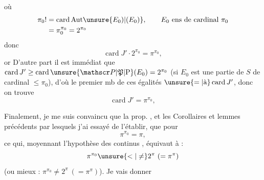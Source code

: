 où
\[
\begin{aligned}
\pi_0!&=\operatorname{card}\mathrm{Aut}\unsure{E_0)|(E_0)},\qquad E_0\text{ ens de cardinal }\pi_0\\
&=\pi_0^{\pi_0}=2^{\pi_0}
\end{aligned}
\]
donc
\[
\operatorname{card}J'\cdot2^{\pi_0}=\pi^{\pi_0},
\]
or
D'autre part il est immédiat que $\operatorname{card}J'\geq\operatorname{card}\unsure{\mathscr P|\mathfrak P|\mathrm P}(E_0)=2^{\pi_0}$ (si $E_0$ est une partie de $S$ de cardinal $\leq\pi_0$), d'où le  premier mb de ces égalités $\unsure{=|\text{à}}\operatorname{card}J'$, donc on trouve
\[
\operatorname{card}J'=\pi^{\pi_0},
\]

Finalement, je me suis convaincu que la prop. , et les Corollaires et lemmes précédents par lesquels j'ai essayé de l'établir,  que pour   
\[
\pi^{\pi_0}=\pi,
\]
ce qui, moyennant l'hypothèse des continus , équivaut à :
\[
\pi^{\pi_0}\unsure{<|\neq}2^\pi\ (=\pi^\pi)
\]
(ou mieux : $\pi^{\pi_0}\neq2^\pi\ (=\pi^\pi)$). Je vais donner
